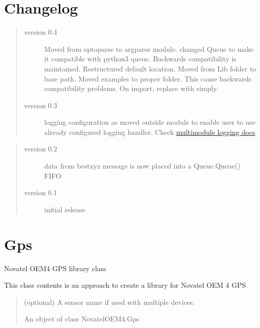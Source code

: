 \section{Changelog}
\label{\detokenize{index:changelog}}\begin{quote}\begin{description}
		\item[{version 0.4}] \leavevmode
		Moved from optoparse to argparse module.
		changed Queue to make it compatible with python3 queue. Backwards compatibility is maintained.
		Restructured default location. Moved from Lib folder to base path.
		Moved examples to proper folder. This cause backwards compatibility problems. On import, replace
		 with simply 
		
		\item[{version 0.3}] \leavevmode
		logging configuration as moved outside module to enable user to use already
		configured logging handler. Check \href{https://docs.python.org/2/howto/logging-cookbook.html\#using-logging-in-multiple-modules{}`}{multimodule logging docs}
		
\end{description}\end{quote}
\begin{quote}\begin{description}
		\item[{version 0.2}] \leavevmode
		data from bestxyz message is now placed into a Queue.Queue() FIFO
		
		\item[{version 0.1}] \leavevmode
		initial release
\end{description}\end{quote}

\section[class NovatelOEM4.Gps]{\textbf{Gps}}
Novatel OEM4 GPS library class

This class contents is an approach to create a library for Novatel OEM 4 GPS
\begin{quote}
\begin{description}[style=nextline]
		\item[Parameters] \leavevmode
		 (optional) \textendash{} A sensor name if used with multiple devices.
		\item[Returns] An object of class NovatelOEM4.Gps	
\end{description}
\end{quote}

